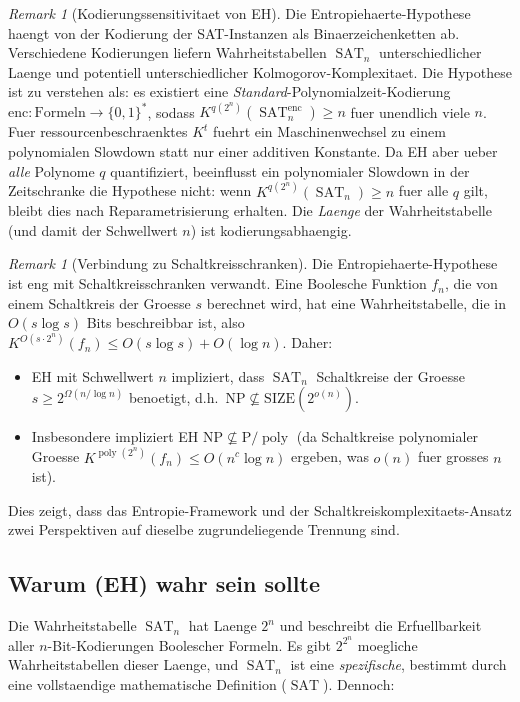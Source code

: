 \documentclass[aps,prd,twocolumn,superscriptaddress,nofootinbib]{revtex4-2}
\theoremstyle{definition}
\theoremstyle{remark}
\newtheorem{remark}[theorem]{Remark}
\DeclareMathOperator{\poly}{poly}
\DeclareMathOperator{\SAT}{SAT}
\newcommand{\NP}{\mathrm{NP}}
\newcommand{\PP}{\mathrm{P}}
\begin{document}
\begin{remark}[Kodierungssensitivitaet von EH]
\label{rem:encoding}
Die Entropiehaerte-Hypothese haengt von der Kodierung der SAT-Instanzen als Binaerzeichenketten ab. Verschiedene Kodierungen liefern Wahrheitstabellen $\SAT_n$ unterschiedlicher Laenge und potentiell unterschiedlicher Kolmogorov-Komplexitaet. Die Hypothese ist zu verstehen als: es existiert eine \emph{Standard}-Polynomialzeit-Kodierung $\mathrm{enc}: \mathrm{Formeln} \to \{0,1\}^*$, sodass $K^{q(2^n)}(\SAT_n^{\mathrm{enc}}) \geq n$ fuer unendlich viele $n$. Fuer ressourcenbeschraenktes $K^t$ fuehrt ein Maschinenwechsel zu einem polynomialen Slowdown statt nur einer additiven Konstante. Da EH aber ueber \emph{alle} Polynome $q$ quantifiziert, beeinflusst ein polynomialer Slowdown in der Zeitschranke die Hypothese nicht: wenn $K^{q(2^n)}(\SAT_n) \geq n$ fuer alle $q$ gilt, bleibt dies nach Reparametrisierung erhalten. Die \emph{Laenge} der Wahrheitstabelle (und damit der Schwellwert $n$) ist kodierungsabhaengig.
\end{remark}

\begin{remark}[Verbindung zu Schaltkreisschranken]
\label{rem:circuit-connection}
Die Entropiehaerte-Hypothese ist eng mit Schaltkreisschranken verwandt. Eine Boolesche Funktion $f_n$, die von einem Schaltkreis der Groesse $s$ berechnet wird, hat eine Wahrheitstabelle, die in $O(s \log s)$ Bits beschreibbar ist, also $K^{O(s \cdot 2^n)}(f_n) \leq O(s \log s) + O(\log n)$. Daher:
\begin{itemize}
\item EH mit Schwellwert $n$ impliziert, dass $\SAT_n$ Schaltkreise der Groesse $s \geq 2^{\Omega(n / \log n)}$ benoetigt, d.h.\ $\NP \not\subseteq \mathrm{SIZE}(2^{o(n)})$.
\item Insbesondere impliziert EH $\NP \not\subseteq \PP/\poly$ (da Schaltkreise polynomialer Groesse $K^{\poly(2^n)}(f_n) \leq O(n^c \log n)$ ergeben, was $o(n)$ fuer grosses $n$ ist).
\end{itemize}
Dies zeigt, dass das Entropie-Framework und der Schaltkreiskomplexitaets-Ansatz zwei Perspektiven auf dieselbe zugrundeliegende Trennung sind.
\end{remark}

\subsection{Warum (EH) wahr sein sollte}

Die Wahrheitstabelle $\SAT_n$ hat Laenge $2^n$ und beschreibt die Erfuellbarkeit aller $n$-Bit-Kodierungen Boolescher Formeln. Es gibt $2^{2^n}$ moegliche Wahrheitstabellen dieser Laenge, und $\SAT_n$ ist eine \textit{spezifische}, bestimmt durch eine vollstaendige mathematische Definition ($\SAT$). Dennoch:
\end{document}
